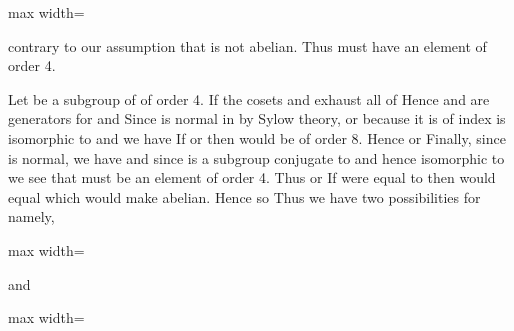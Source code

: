 \documentclass[11pt,oneside]{article}
\begin{document}
\begin{BookBody}
\begin{center}\begin{adjustbox}{max width=\linewidth}\end{adjustbox}\end{center}

\noindent contrary to our assumption that  is not abelian. Thus  must have an element of order 4.

Let  be a subgroup of  of order 4. If  the cosets  and  exhaust all of  Hence  and  are generators for  and  Since  is normal in by Sylow theory, or because it is of index  is isomorphic to  and we have  If  or  then  would be of order 8. Hence  or  Finally, since  is normal, we have  and since  is a subgroup conjugate to  and hence isomorphic to  we see that  must be an element of order 4. Thus  or  If  were equal to  then  would equal  which would make  abelian. Hence  so  Thus we have two possibilities for  namely,

\begin{center}\begin{adjustbox}{max width=\linewidth}\end{adjustbox}\end{center}

\noindent and

\begin{center}\begin{adjustbox}{max width=\linewidth}\end{adjustbox}\end{center}


\end{BookBody}
\end{document}
